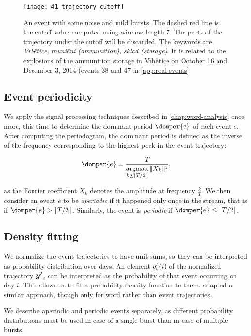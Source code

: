 \begin{figure}
  \centering
  \texttt{[image: 41\_trajectory\_cutoff]}  %
  \caption{An event with some noise and mild bursts. The dashed red line is the cutoff value computed using window length 7. The parts of the trajectory under the cutoff will be discarded. The keywords are \textit{Vrbětice, muniční (ammunition), sklad (storage)}. It is related to the explosions of the ammunition storage in Vrbětice on October 16 and December 3, 2014 (events 38 and 47 in \autoref{app:real-events}}
  \label{fig:vrbetice-trajectory}
\end{figure}


\subsection{Event periodicity}
We apply the signal processing techniques described in \autoref{chap:word-analysis} once more, this time to determine the dominant period $\domper{e}$ of each event $e$. After computing the periodogram, the dominant period is defined as the inverse of the frequency corresponding to the highest peak in the event trajectory:

\begin{equation}
	\domper{e} = \frac{\streamlen}{\argmax\limits_{k \leq \ceil{\streamlen / 2}}{\|X_{k}\|^{2}}},
\end{equation}

as the Fourier coefficient $X_{k}$ denotes the amplitude at frequency $\frac{k}{T}$. We then consider an event $e$ to be \textit{aperiodic} if it happened only once in the stream, that is if $\domper{e} > \ceil{\streamlen / 2}$. Similarly, the event is \textit{periodic} if $\domper{e} \leq \ceil{\streamlen / 2}$.

\subsection{Density fitting}
We normalize the event trajectories to have unit sums, so they can be interpreted as probability distribution over days. An element $y'_{e}(i)$ of the normalized trajectory $\vect{\trajn}_{e}$ can be interpreted as the probability of that event occurring on day $i$. This allows us to fit a probability density function to them. \cite{event-detection} adapted a similar approach, though only for word rather than event trajectories.

We describe aperiodic and periodic events separately, as different probability distributions must be used in case of a single burst than in case of multiple bursts.

